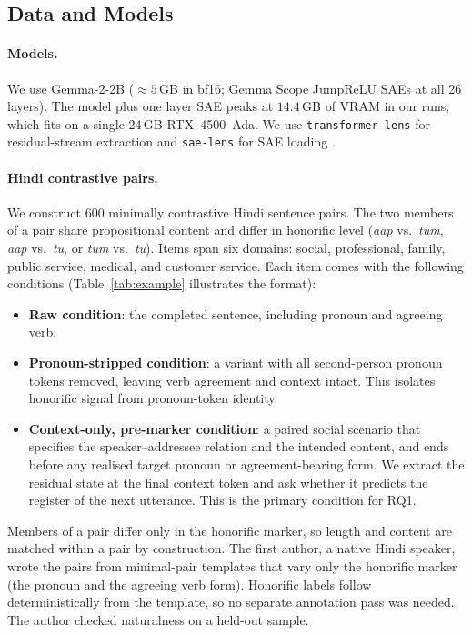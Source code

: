 \documentclass[11pt]{article}
\newcommand{\aap}{\textit{aap}}
\newcommand{\tum}{\textit{tum}}
\newcommand{\tu}{\textit{tu}}
\begin{document}
\subsection{Data and Models}
\label{sec:dataset}

\paragraph{Models.}
We use Gemma-2-2B (${\approx}5$\,GB in bf16; Gemma Scope JumpReLU SAEs at all 26
layers). The model plus one layer SAE peaks at $14.4$\,GB of VRAM in our runs, which
fits on a single 24\,GB RTX~4500~Ada. We use \texttt{transformer-lens} for
residual-stream extraction \citep{nanda2022transformerlens} and
\texttt{sae-lens} for SAE loading \citep{bloom2024saelens}.

\paragraph{Hindi contrastive pairs.}
We construct 600 minimally contrastive Hindi sentence pairs. The two members
of a pair share propositional content and differ in honorific level (\aap{} vs.\
\tum, \aap{} vs.\ \tu, or \tum{} vs.\ \tu). Items span six domains: social,
professional, family, public service, medical, and customer service. Each item
comes with the following conditions (Table~\ref{tab:example} illustrates the
format):

\begin{itemize}\itemsep0pt
  \item \textbf{Raw condition}: the completed sentence, including pronoun and
        agreeing verb.
  \item \textbf{Pronoun-stripped condition}: a variant with all second-person
        pronoun tokens removed, leaving verb agreement and context intact. This
        isolates honorific signal from pronoun-token identity.
  \item \textbf{Context-only, pre-marker condition}: a paired social scenario
        that specifies the speaker--addressee relation and the intended content,
        and ends before any realised target pronoun or agreement-bearing form. We
        extract the residual state at the final context token and ask whether it
        predicts the register of the next utterance. This is the primary
        condition for RQ1.
\end{itemize}

Members of a pair differ only in the honorific marker, so length and content
are matched within a pair by construction. The first author, a native Hindi
speaker, wrote the pairs from minimal-pair templates that vary only the
honorific marker (the pronoun and the agreeing verb form). Honorific labels
follow deterministically from the template, so no separate annotation pass was
needed. The author checked naturalness on a held-out sample.
\end{document}
